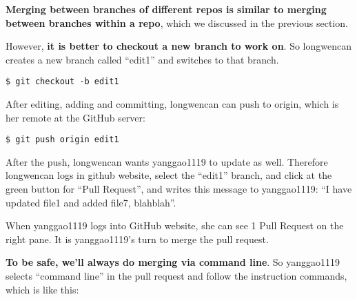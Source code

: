 \documentclass{article} %
\newcommand{\q}[1]{``#1''}
\begin{document}
\textbf{Merging between branches of different repos is similar to merging between branches within a repo}, which we discussed in the previous section.

However, \textbf{it is better to checkout a new branch to work on}. So longwencan creates a new branch called \q{edit1} and switches to that branch.

\begin{lstlisting}
$ git checkout -b edit1
\end{lstlisting}

After editing, adding and committing, longwencan can push to origin, which is her remote at the GitHub server:

\begin{lstlisting}
$ git push origin edit1
\end{lstlisting}

After the push, longwencan wants yanggao1119 to update as well. Therefore longwencan logs in github website, select the \q{edit1} branch, and click at the green button for \q{Pull Request}, and writes this message to yanggao1119: \q{I have updated file1 and added file7, blahblah}. 

When yanggao1119 logs into GitHub website, she can see 1 Pull Request on the right pane. It is yanggao1119's turn to merge the pull request. 

\textbf{To be safe, we'll always do merging via command line}. So yanggao1119 selects \q{command line} in the pull request and follow the instruction commands, which is like this:
\end{document}
